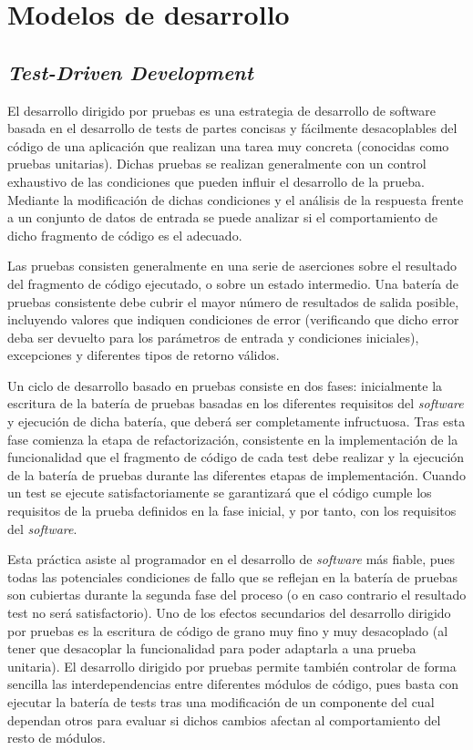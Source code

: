 \section{Modelos de desarrollo}
\subsection{\textit{Test-Driven Development}}
\label{tdd}

El desarrollo dirigido por pruebas es una estrategia de desarrollo de software basada en el desarrollo de tests de partes concisas y fácilmente desacoplables del código de una aplicación que realizan una tarea muy concreta (conocidas como pruebas unitarias). Dichas pruebas se realizan generalmente con un control exhaustivo de las condiciones que pueden influir el desarrollo de la prueba. Mediante la modificación de dichas condiciones y el análisis de la respuesta frente a un conjunto de datos de entrada se puede analizar si el comportamiento de dicho fragmento de código es el adecuado.

Las pruebas consisten generalmente en una serie de aserciones sobre el resultado del fragmento de código ejecutado, o sobre un estado intermedio. Una batería de pruebas consistente debe cubrir el mayor número de resultados de salida posible, incluyendo valores que indiquen condiciones de error (verificando que dicho error deba ser devuelto para los parámetros de entrada y condiciones iniciales), excepciones y diferentes tipos de retorno válidos.

Un ciclo de desarrollo basado en pruebas consiste en dos fases: inicialmente la escritura de la batería de pruebas basadas en los diferentes requisitos del \textit{software} y ejecución de dicha batería, que deberá ser completamente infructuosa. Tras esta fase comienza la etapa de refactorización, consistente en la implementación de la funcionalidad que el fragmento de código de cada test debe realizar y la ejecución de la batería de pruebas durante las diferentes etapas de implementación. Cuando un test se ejecute satisfactoriamente se garantizará que el código cumple los requisitos de la prueba definidos en la fase inicial, y por tanto, con los requisitos del \textit{software}.

Esta práctica asiste al programador en el desarrollo de \textit{software} más fiable, pues todas las potenciales condiciones de fallo que se reflejan en la batería de pruebas son cubiertas durante la segunda fase del proceso (o en caso contrario el resultado test no será satisfactorio). Uno de los efectos secundarios del desarrollo dirigido por pruebas es la escritura de código de grano muy fino y muy desacoplado (al tener que desacoplar la funcionalidad para poder adaptarla a una prueba unitaria). El desarrollo dirigido por pruebas permite también controlar de forma sencilla las interdependencias entre diferentes módulos de código, pues basta con ejecutar la batería de tests tras una modificación de un componente del cual dependan otros para evaluar si dichos cambios afectan al comportamiento del resto de módulos.

